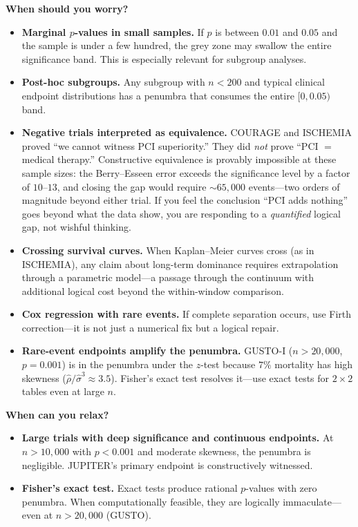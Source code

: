 \documentclass[11pt,a4paper]{article}
\theoremstyle{plain}
\theoremstyle{definition}
\begin{document}
\begin{tcolorbox}[
  colback=blue!5,
  colframe=blue!50!black,
  fonttitle=\bfseries\large,
  title={What This Means for a Clinician},
  arc=4pt,
  boxrule=1pt
]
\textbf{When should you worry?}
\begin{itemize}[nosep, leftmargin=*]
\item \textbf{Marginal $p$-values in small samples.}  If $p$ is between $0.01$ and $0.05$ and the sample is under a few hundred, the grey zone may swallow the entire significance band.  This is especially relevant for subgroup analyses.
\item \textbf{Post-hoc subgroups.}  Any subgroup with $n < 200$ and typical clinical endpoint distributions has a penumbra that consumes the entire $[0, 0.05)$ band.
\item \textbf{Negative trials interpreted as equivalence.}  COURAGE and ISCHEMIA proved ``we cannot witness PCI superiority.''  They did \emph{not} prove ``PCI $=$ medical therapy.''  Constructive equivalence is provably impossible at these sample sizes: the Berry--Esseen error exceeds the significance level by a factor of $10$--$13$, and closing the gap would require $\sim\!65{,}000$ events---two orders of magnitude beyond either trial.  If you feel the conclusion ``PCI adds nothing'' goes beyond what the data show, you are responding to a \emph{quantified} logical gap, not wishful thinking.
\item \textbf{Crossing survival curves.}  When Kaplan--Meier curves cross (as in ISCHEMIA), any claim about long-term dominance requires extrapolation through a parametric model---a passage through the continuum with additional logical cost beyond the within-window comparison.
\item \textbf{Cox regression with rare events.}  If complete separation occurs, use Firth correction---it is not just a numerical fix but a logical repair.
\item \textbf{Rare-event endpoints amplify the penumbra.}  GUSTO-I ($n > 20{,}000$, $p = 0.001$) is in the penumbra under the $z$-test because $7\%$ mortality has high skewness ($\hat\rho/\hat\sigma^3 \approx 3.5$).  Fisher's exact test resolves it---use exact tests for $2 \times 2$ tables even at large $n$.
\end{itemize}

\medskip

\textbf{When can you relax?}
\begin{itemize}[nosep, leftmargin=*]
\item \textbf{Large trials with deep significance and continuous endpoints.}  At $n > 10{,}000$ with $p < 0.001$ and moderate skewness, the penumbra is negligible.  JUPITER's primary endpoint is constructively witnessed.
\item \textbf{Fisher's exact test.}  Exact tests produce rational $p$-values with zero penumbra.  When computationally feasible, they are logically immaculate---even at $n > 20{,}000$ (GUSTO).
\end{itemize}


\end{tcolorbox}
\end{document}
